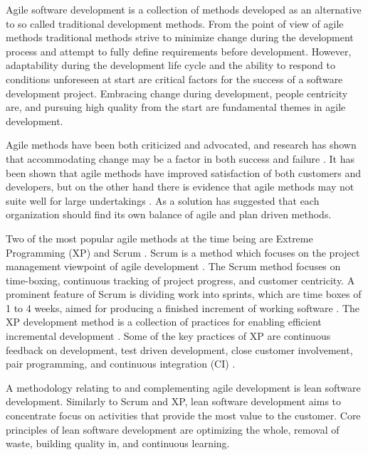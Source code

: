 Agile software development is a collection of methods developed as an alternative
to so called traditional development methods. From the point of view of agile
methods traditional methods strive to minimize change during the development
process and attempt to fully define requirements before development. However,
adaptability during the development life cycle and the ability to respond to
conditions unforeseen at start are critical factors for the success of a
software development project. Embracing change during development, people
centricity are, and pursuing high quality from the start are fundamental themes
in agile development.
\cite{Highsmith2001,Cockburn2001}

Agile methods have been both criticized and advocated, and research has shown
that accommodating change may be a factor in both success and failure
\cite{Boehm2002}. It has been shown that agile methods have improved
satisfaction of both customers and developers, but on the other hand there is
evidence that agile methods may not suite well for large undertakings
\cite{Dyba2009}. As a solution \citet{Boehm2002} has suggested that each
organization should find its own balance of agile and plan driven methods.

Two of the most popular agile methods at the time being are Extreme Programming
(XP) and Scrum \cite{Hamed2013}. Scrum is a method which focuses on the project
management viewpoint of agile development \cite{Schwaber2002}. The Scrum method
focuses on time-boxing, continuous tracking of project progress, and customer
centricity. A prominent feature of Scrum is dividing work into sprints, which
are time boxes of 1 to 4 weeks, aimed for producing a finished increment of
working software \cite{Schwaber2002}. The XP development method is a collection
of practices for enabling efficient incremental development \cite{Beck1999}.
Some of the key practices of XP are continuous feedback on development, test
driven development, close customer involvement, pair programming, and continuous
integration (CI) \cite{Beck1999}.

A methodology relating to and complementing agile development is lean software
development. Similarly to Scrum and XP, lean software development aims to
concentrate focus on activities that provide the most value to the customer.
Core principles of lean software development are optimizing the whole, removal
of waste, building quality in, and continuous learning. \cite{Poppendieck2012}




